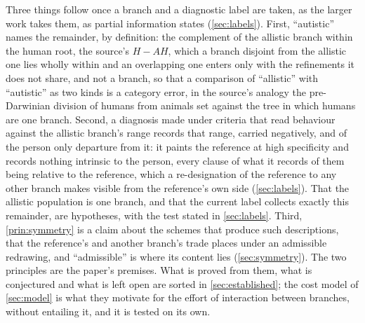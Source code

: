 \noindent Three things follow once a branch and a diagnostic label are taken, as the larger work takes them, as partial information states (\autoref{sec:labels}). First, ``autistic'' names the remainder, by definition: the complement of the allistic branch within the human root, the source's $H - AH$, which a branch disjoint from the allistic one lies wholly within and an overlapping one enters only with the refinements it does not share, and not a branch, so that a comparison of ``allistic'' with ``autistic'' as two kinds is a category error, in the source's analogy the pre-Darwinian division of humans from animals set against the tree in which humans are one branch. Second, a diagnosis made under criteria that read behaviour against the allistic branch's range records that range, carried negatively, and of the person only departure from it: it paints the reference at high specificity and records nothing intrinsic to the person, every clause of what it records of them being relative to the reference, which a re-designation of the reference to any other branch makes visible from the reference's own side (\autoref{sec:labels}). That the allistic population is one branch, and that the current label collects exactly this remainder, are hypotheses, with the test stated in \autoref{sec:labels}. Third, \autoref{prin:symmetry} is a claim about the schemes that produce such descriptions, that the reference's and another branch's trade places under an admissible redrawing, and ``admissible'' is where its content lies (\autoref{sec:symmetry}). The two principles are the paper's premises. What is proved from them, what is conjectured and what is left open are sorted in \autoref{sec:established}; the cost model of \autoref{sec:model} is what they motivate for the effort of interaction between branches, without entailing it, and it is tested on its own.
